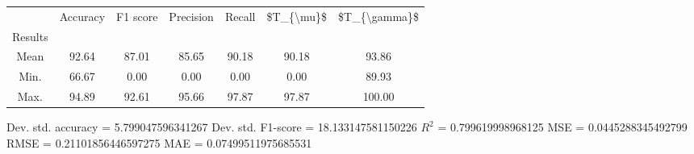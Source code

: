 \begin{tabular}{|c|c|c|c|c|c|c|}
\toprule
{} &  Accuracy &  F1 score &  Precision &  Recall &  \$T\_\{\textbackslash mu\}\$ &  \$T\_\{\textbackslash gamma\}\$ \\
Results &           &           &            &         &            &               \\
\hline
Mean    &     92.64 &     87.01 &      85.65 &   90.18 &      90.18 &         93.86 \\
Min.    &     66.67 &      0.00 &       0.00 &    0.00 &       0.00 &         89.93 \\
Max.    &     94.89 &     92.61 &      95.66 &   97.87 &      97.87 &        100.00 \\
\bottomrule
\end{tabular}

 Dev. std. accuracy = 5.799047596341267
 Dev. std. F1-score = 18.133147581150226
 $R^2$ = 0.799619998968125
 MSE = 0.0445288345492799
 RMSE = 0.21101856446597275
 MAE = 0.07499511975685531